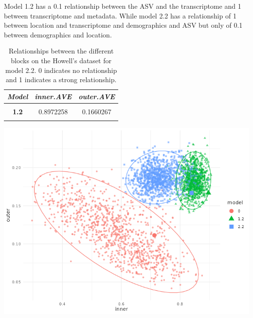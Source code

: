 \documentclass[
  12pt,
  a4paper,
  twoside,
  openright]{book}
\let\origfigure\figure
\let\endorigfigure\endfigure
\renewenvironment{figure}[1][2] {
    \expandafter\origfigure\expandafter[!ht]
} {
    \endorigfigure
}
\begin{document}
Model 1.2 has a 0.1 relationship between the ASV and the transcriptome and 1 between transcriptome and metadata.
While model 2.2 has a relationship of 1 between location and transcriptome and demographics and ASV but only of 0.1 between demographics and location.

\begin{table}[H]

\caption[Models 2.2 of Howell's dataset.]{\label{tab:howell-models-ave}Relationships between the different blocks on the Howell's dataset for model 2.2. 0 indicates no relationship and 1 indicates a strong relationship.}
\centering
\begin{tabular}[t]{|>{}c|c|>{}c|}
\hline
\em{\textbf{Model}} & \em{\textbf{inner.AVE}} & \em{\textbf{outer.AVE}}\\
\hline
\textbf{\cellcolor{gray!6}{0.0}} & \cellcolor{gray!6}{0.7180980} & \cellcolor{gray!6}{0.1112390}\\
\hline
\textbf{1.2} & 0.8972258 & 0.1660267\\
\hline
\textbf{\cellcolor{gray!6}{2.2}} & \cellcolor{gray!6}{0.8433274} & \cellcolor{gray!6}{0.1659844}\\
\hline
\end{tabular}
\end{table}

\begin{figure}
\includegraphics[width=1\linewidth]{images/howells_models_bootstrap} \caption[Bootstrap of models on Howell's datset.]{Bootstrap of the different models on the inner and outer AVE: Model 0 has just trancriptomic and microbiome data, model 1.2 has transcriptomic, microbiome and sample data and model 2.2 has transcriptomic, microbiome and sample data split in different blocks. The bigger points are the models on the original dataset.}\label{fig:howell-bootstrap}
\end{figure}
\end{document}

